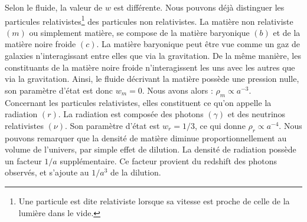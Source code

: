 Selon le fluide, la valeur de $w$ est différente. Nous pouvons déjà distinguer les particules relativistes\footnote{Une particule est dite relativiste lorsque sa vitesse est proche de celle de la lumière dans le vide.} des particules non relativistes. La matière non relativiste $(m)$ ou simplement matière, se compose de la matière baryonique $(b)$ et de la matière noire froide $(c)$.
La matière baryonique peut être vue comme un gaz de galaxies n'interagissant entre elles  que via la gravitation.
De la même manière, les constituants de la matière noire froide n'interagissent les uns avec les autres que via la gravitation.
Ainsi, le fluide décrivant la matière possède une pression nulle, son paramètre d'état est donc $w_m = 0$. Nous avons alors : $\rho_m \propto a^{-3}$. \\
Concernant les particules relativistes, elles constituent ce qu'on appelle la radiation $(r)$. La radiation est composée  des photons $(\gamma)$ et des neutrinos relativistes $(\nu)$. Son paramètre d'état est $w_r = 1/3$, ce qui donne $\rho_r \propto a^{-4}$. Nous pouvons remarquer que la densité de matière diminue proportionnellement au volume de l'univers, par simple effet de dilution. La densité de radiation possède un facteur $1/a$ supplémentaire. Ce facteur provient du redshift des photons observés, et s'ajoute au $1/a^3$ de la dilution.

